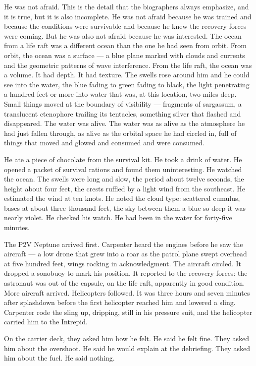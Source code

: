 \documentclass[12pt, letterpaper]{article}
\begin{document}
He was not afraid. This is the detail that the biographers always emphasize, and it is true, but it is also incomplete. He was not afraid because he was trained and because the conditions were survivable and because he knew the recovery forces were coming. But he was also not afraid because he was interested. The ocean from a life raft was a different ocean than the one he had seen from orbit. From orbit, the ocean was a surface --- a blue plane marked with clouds and currents and the geometric patterns of wave interference. From the life raft, the ocean was a volume. It had depth. It had texture. The swells rose around him and he could see into the water, the blue fading to green fading to black, the light penetrating a hundred feet or more into water that was, at this location, two miles deep. Small things moved at the boundary of visibility --- fragments of sargassum, a translucent ctenophore trailing its tentacles, something silver that flashed and disappeared. The water was alive. The water was as alive as the atmosphere he had just fallen through, as alive as the orbital space he had circled in, full of things that moved and glowed and consumed and were consumed.

He ate a piece of chocolate from the survival kit. He took a drink of water. He opened a packet of survival rations and found them uninteresting. He watched the ocean. The swells were long and slow, the period about twelve seconds, the height about four feet, the crests ruffled by a light wind from the southeast. He estimated the wind at ten knots. He noted the cloud type: scattered cumulus, bases at about three thousand feet, the sky between them a blue so deep it was nearly violet. He checked his watch. He had been in the water for forty-five minutes.

The P2V Neptune arrived first. Carpenter heard the engines before he saw the aircraft --- a low drone that grew into a roar as the patrol plane swept overhead at five hundred feet, wings rocking in acknowledgment. The aircraft circled. It dropped a sonobuoy to mark his position. It reported to the recovery forces: the astronaut was out of the capsule, on the life raft, apparently in good condition. More aircraft arrived. Helicopters followed. It was three hours and seven minutes after splashdown before the first helicopter reached him and lowered a sling. Carpenter rode the sling up, dripping, still in his pressure suit, and the helicopter carried him to the Intrepid.

On the carrier deck, they asked him how he felt. He said he felt fine. They asked him about the overshoot. He said he would explain at the debriefing. They asked him about the fuel. He said nothing.
\end{document}
